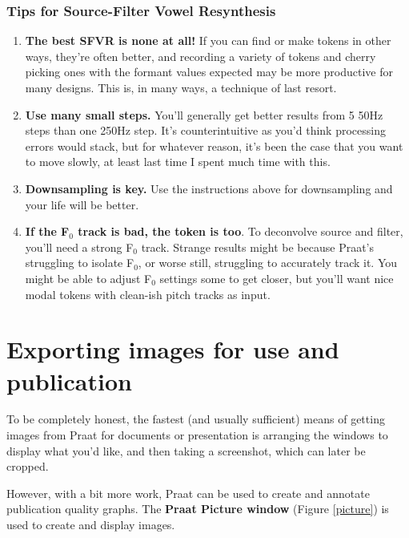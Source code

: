 \hypertarget{tips-for-source-filter-vowel-resynthesis}{%
\subsubsection{Tips for Source-Filter Vowel
Resynthesis}\label{tips-for-source-filter-vowel-resynthesis}}

\begin{enumerate}
\def\labelenumi{\arabic{enumi})}
\item
  \textbf{The best SFVR is none at all!} If you can find or make tokens
  in other ways, they're often better, and recording a variety of tokens
  and cherry picking ones with the formant values expected may be more
  productive for many designs. This is, in many ways, a technique of
  last resort.
\item
  \textbf{Use many small steps.} You'll generally get better results
  from 5 50Hz steps than one 250Hz step. It's counterintuitive as you'd
  think processing errors would stack, but for whatever reason, it's
  been the case that you want to move slowly, at least last time I spent
  much time with this.
\item
  \textbf{Downsampling is key.} Use the instructions above for
  downsampling and your life will be better.
\item
  \textbf{If the F$_{0}$ track is bad, the token is too}. To deconvolve
  source and filter, you'll need a strong F$_{0}$ track. Strange results
  might be because Praat's struggling to isolate F$_{0}$, or worse still,
  struggling to accurately track it. You might be able to adjust F$_{0}$
  settings some to get closer, but you'll want nice modal tokens with
  clean-ish pitch tracks as input.
\end{enumerate}

\hypertarget{exporting-images-for-use-and-publication}{%
\section{Exporting images for use and
publication}\label{exporting-images-for-use-and-publication}}

\label{sec:pictures}

To be completely honest, the fastest (and usually sufficient) means of
getting images from Praat for documents or presentation is arranging the
windows to display what you'd like, and then taking a screenshot, which
can later be cropped.

However, with a bit more work, Praat can be used to create and annotate
publication quality graphs. The \textbf{Praat Picture window} (Figure
\ref{picture}) is used to create and display images.

